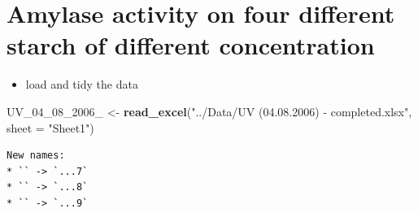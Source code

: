 \documentclass[
  12pt,
]{article}
\newenvironment{Shaded}{\begin{snugshade}}{\end{snugshade}}
\newcommand{\AttributeTok}[1]{\textcolor[rgb]{0.13,0.29,0.53}{#1}}
\newcommand{\FunctionTok}[1]{\textcolor[rgb]{0.13,0.29,0.53}{\textbf{#1}}}
\newcommand{\NormalTok}[1]{#1}
\newcommand{\OtherTok}[1]{\textcolor[rgb]{0.56,0.35,0.01}{#1}}
\newcommand{\StringTok}[1]{\textcolor[rgb]{0.31,0.60,0.02}{#1}}
\providecommand{\tightlist}{%
  \setlength{\itemsep}{0pt}\setlength{\parskip}{0pt}}
\begin{document}
\section{Amylase activity on four different starch of different
concentration}\label{amylase-activity-on-four-different-starch-of-different-concentration}

\begin{itemize}
\tightlist
\item
  load and tidy the data
\end{itemize}

\begin{Shaded}
\begin{Highlighting}[]
\NormalTok{UV\_04\_08\_2006\_ }\OtherTok{\textless{}{-}} \FunctionTok{read\_excel}\NormalTok{(}\StringTok{"../Data/UV (04.08.2006) {-} completed.xlsx"}\NormalTok{, }
                             \AttributeTok{sheet =} \StringTok{"Sheet1"}\NormalTok{)}
\end{Highlighting}
\end{Shaded}

\begin{verbatim}
New names:
* `` -> `...7`
* `` -> `...8`
* `` -> `...9`
\end{verbatim}
\end{document}

